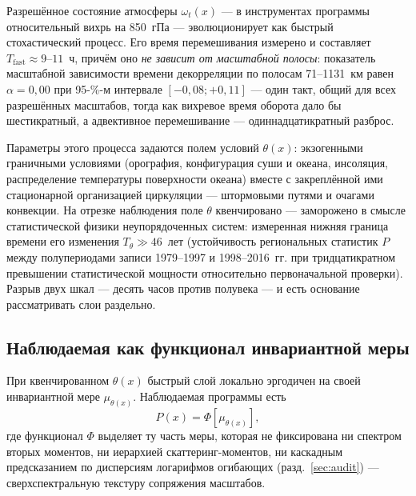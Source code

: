 \documentclass[11pt,a4paper]{article}
\begin{document}
Разрешённое состояние атмосферы $\omega_t(x)$ --- в инструментах программы относительный вихрь на 850~гПа --- эволюционирует как быстрый стохастический процесс. Его время перемешивания измерено и составляет $T_{\mathrm{fast}}\approx9$--$11$~ч, причём оно \emph{не зависит от масштабной полосы}: показатель масштабной зависимости времени декорреляции по полосам 71--1131~км равен $\alpha=0{,}00$ при 95-\%-м интервале $[-0{,}08;+0{,}11]$ --- один такт, общий для всех разрешённых масштабов, тогда как вихревое время оборота дало бы шестикратный, а адвективное перемешивание --- одиннадцатикратный разброс.

Параметры этого процесса задаются полем условий $\theta(x)$: экзогенными граничными условиями (орография, конфигурация суши и океана, инсоляция, распределение температуры поверхности океана) вместе с закреплённой ими стационарной организацией циркуляции --- штормовыми путями и очагами конвекции. На отрезке наблюдения поле $\theta$ квенчировано --- заморожено в смысле статистической физики неупорядоченных систем: измеренная нижняя граница времени его изменения $T_\theta\gg46$~лет (устойчивость региональных статистик $P$ между полупериодами записи 1979--1997 и 1998--2016~гг. при тридцатикратном превышении статистической мощности относительно первоначальной проверки). Разрыв двух шкал --- десять часов против полувека --- и есть основание рассматривать слои раздельно.

\subsection{Наблюдаемая как функционал инвариантной меры}
\label{sec:functional}

При квенчированном $\theta(x)$ быстрый слой локально эргодичен на своей инвариантной мере $\mu_{\theta(x)}$. Наблюдаемая программы есть
\begin{equation}
P(x)=\Phi\!\left[\mu_{\theta(x)}\right],
\label{eq:phi}
\end{equation}
где функционал $\Phi$ выделяет ту часть меры, которая не фиксирована ни спектром вторых моментов, ни иерархией скаттеринг-моментов, ни каскадным предсказанием по дисперсиям логарифмов огибающих (разд.~\ref{sec:audit}) --- сверхспектральную текстуру сопряжения масштабов.
\end{document}
